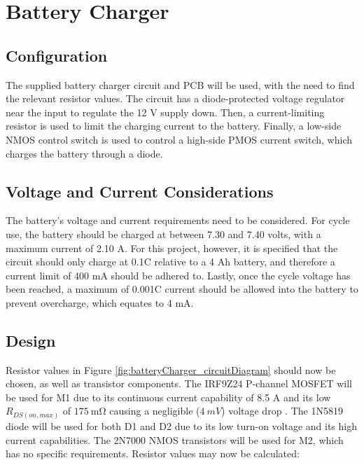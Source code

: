 \graphicspath{{content/2_design/figures/}}
\section{Battery Charger}

\subsection{Configuration}

The supplied battery charger circuit and PCB will be used, with the need to find the relevant resistor values.
The circuit has a diode-protected voltage regulator near the input to regulate the 12 V supply down. Then, a current-limiting
resistor is used to limit the charging current to the battery. Finally, a low-side NMOS control switch is used to control a high-side
PMOS current switch, which charges the battery through a diode.

\subsection{Voltage and Current Considerations}

The battery's voltage and current requirements need to be considered. For cycle use, the battery should be charged at between
7.30 and 7.40 volts, with a maximum current of 2.10 A. For this project, however, it is specified that the circuit should only charge
at 0.1C relative to a 4 Ah battery, and therefore a current limit of 400 mA should be adhered to. Lastly, once the cycle voltage has
been reached, a maximum of 0.001C current should be allowed into the battery to prevent overcharge, which equates to 4 mA.

\subsection{Design}

Resistor values in Figure \ref{fig:batteryCharger_circuitDiagram} should now be chosen, as well as transistor components.
The IRF9Z24 P-channel MOSFET will be used for M1 due to its continuous current capability of 8.5 A
and its low $R_{DS(on, max)}$ of $\SI{175}{\milli\ohm}$ causing a negligible ($\SI{4}{mV}$) voltage drop \cite{datasheetIRF9Z24N}.
The 1N5819 diode will be used for both D1 and D2 due to its low turn-on voltage and its high current capabilities.
The 2N7000 NMOS transistors will be used for M2, which has no specific requirements. Resistor values may now be calculated:

